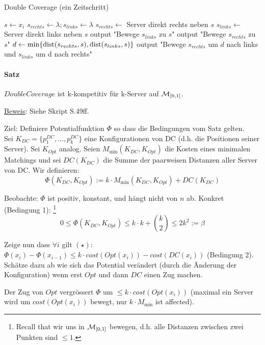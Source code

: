 \begin{algorithm}[h]
\caption{Double Coverage (ein Zeitschritt)}
\begin{algorithmic}
    \State $s \gets x_i$
    \State $s_{rechts} \gets \lambda; s_{links} \gets \lambda$
    \State $s_{rechts} \gets $ Server direkt rechts neben $s$
    \State $s_{links} \gets $ Server direkt links neben $s$
        \State output "Bewege $s_{links}$ zu $s$"
    \State output "Bewege $s_{rechts}$ zu $s$"
    \Else
    \State $d \gets \min \{ \text{dist}(s_{rechts} , s), \text{dist}(s_{links} , s) \}$
    \State output "Bewege $s_{rechts}$ um $d$ nach links und $s_{links}$ um d nach rechts"
    \EndIf
\end{algorithmic}
\end{algorithm}

\paragraph{Satz}
$DoubleCoverage$ ist k-kompetitiv für k-Server auf $\mathcal{M}_{[0,1]}$.

\underline{Beweis}:
Siehe Skript S.49ff.

Ziel: Definiere Potentialfunktion $\Phi$ so dass die Bedingungen vom Satz gelten.
\\
Sei $K_{DC} = \{p_1^{DC}, \dots , p_k^{DC}\}$ eine Konfigurationen von DC (d.h. die Positionen seiner Server).
Sei $K_{Opt}$ analog.
Seien $M_{\min} (K_{DC}, K_{Opt})$ die Kosten eines minimalen Matchings
und sei $DC(K_{DC})$ die Summe der paarweisen Distanzen aller Server von DC.
Wir definieren:
$$\Phi (K_{DC}, K_{Opt}) := k \cdot M_{\min} (K_{DC}, K_{Opt}) + DC(K_{DC}) $$

Beobachte: $\Phi$ ist positiv, konstant, und hängt nicht von $n$ ab. Konkret (Bedingung 1):
\footnote{Recall that wir uns in $\mathcal{M}_{[0,1]}$ bewegen, d.h. alle Distanzen zwischen zwei Punkten sind $\leq 1$.}
$$ 0 \leq \Phi (K_{DC}, K_{Opt}) \leq k \cdot k + \binom{k}{2} \leq 2 k^2 := \beta $$

Zeige nun dass $\forall i$ gilt $(\star)$:
$ \Phi(x_i) - \Phi(x_{i-1}) \leq k \cdot cost(Opt(x_i)) - cost (DC(x_i)) $ (Bedingung 2).
\\
Schätze dazu ab wie sich das Potential verändert (durch die Änderung der Konfiguration)
wenn erst $Opt$ und dann $DC$ einen Zug machen.

Der Zug von $Opt$ vergrössert $\Phi$ um $\leq k \cdot cost(Opt(x_i))$
(maximal ein Server wird um $cost(Opt(x_i))$ bewegt, nur $k \cdot M_{\min}$ ist affected).

